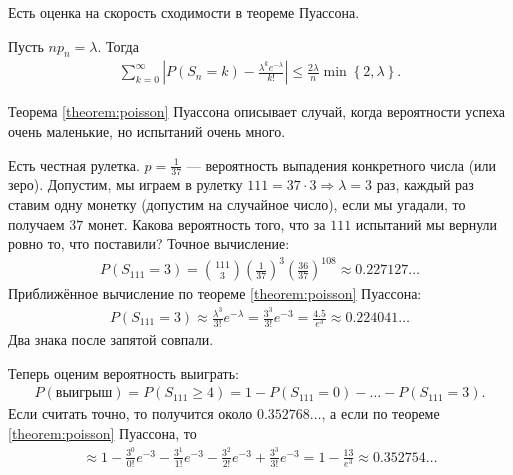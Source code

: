 \documentclass[../main.tex]{subfiles}
\begin{document}
Есть оценка на скорость сходимости в теореме Пуассона.

\begin{thm}[%
 Прохорова]
 Пусть $np_n = \lambda$. Тогда
 \begin{align*}
  \sum_{k=0}^{\infty} \left| P(S_n = k) - \frac{\lambda^{k}e^{-\lambda}}{k!}\right| \leqslant \frac{2\lambda}{n} \min \left\{ 2, \lambda \right\}.
 \end{align*} 
\end{thm}

Теорема \ref{theorem:poisson} Пуассона описывает случай, когда вероятности успеха очень маленькие, но испытаний очень много.

\begin{exmpl*}
 Есть честная рулетка. $p = \frac{1}{37}$ --- вероятность выпадения конкретного числа (или зеро). Допустим, мы играем в рулетку $111=37\cdot3 \Rightarrow \lambda = 3$ раз, каждый раз ставим одну монетку (допустим на случайное число), если мы угадали, то получаем $37$ монет. Какова вероятность того, что за $111$ испытаний мы вернули ровно то, что поставили? Точное вычисление:
 \begin{align*}
  P(S_{111} = 3) = \binom {111} 3 \left( \frac{1}{37} \right)^{3} \left( \frac{36}{37} \right)^{108} \approx 0.227127\ldots
 \end{align*} Приближённое вычисление по теореме \ref{theorem:poisson} Пуассона:
 \begin{align*}
  P(S_{111} = 3) \approx \frac{\lambda^{3}}{3!}e^{-\lambda} = \frac{3^{3}}{3!} e^{-3} = \frac{4.5}{e^{3}} \approx 0.224041\ldots
 \end{align*} Два знака после запятой совпали.

 Теперь оценим вероятность выиграть:
 \begin{align*}
  P(\text{выигрыш}) = P(S_{111} \geqslant 4) = 1 - P(S_{111} = 0) - \ldots - P(S_{111} = 3)
 .\end{align*} Если считать точно, то получится около $0.352768\ldots$, а если по теореме \ref{theorem:poisson} Пуассона, то
 \begin{align*}
  \approx 1 - \frac{3^{0}}{0!}e^{-3} - \frac{3^{1}}{1!}e^{-3} - \frac{3^{2}}{2!}e^{-3} + \frac{3^{3}}{3!}e^{-3} = 1 - \frac{13}{e^{3}} \approx 0.352754\ldots
 \end{align*} 
\end{exmpl*}
\end{document}
